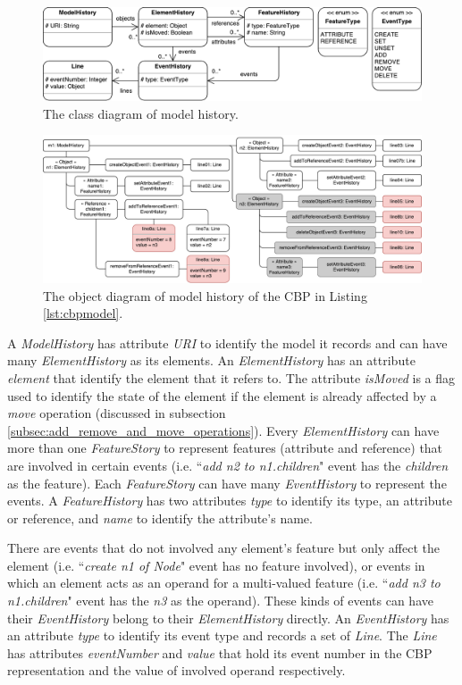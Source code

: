 \documentclass{llncs}
\begin{document}
\begin{figure}[ht]
\centering
\includegraphics[width=\linewidth]{object_history}
\caption{The class diagram of model history.}
\label{fig:object_history}
\end{figure}

\begin{figure}[ht]
\centering
\includegraphics[width=\linewidth]{history_structure}
\caption{The object diagram of model history of the CBP in Listing \ref{lst:cbpmodel}.}
\label{fig:history_structure}
\end{figure}

A \emph{ModelHistory} has attribute \emph{URI} to identify the model it records and can have many \emph{ElementHistory} as its elements. An \emph{ElementHistory} has an attribute \emph{element} that identify the element that it refers to. The attribute \emph{isMoved} is a flag used to identify the state of the element if the element is already affected by a \emph{move} operation (discussed in subsection \ref{subsec:add_remove_and_move_operations}). Every \emph{ElementHistory} can have more than one \emph{FeatureStory} to represent features (attribute and reference) that are involved in certain events (i.e. ``\emph{add n2 to n1.children}" event has the \emph{children} as the feature). Each \emph{FeatureStory} can have many \emph{EventHistory} to represent the events. A \emph{FeatureHistory} has two attributes \emph{type} to identify its type, an attribute or reference, and \emph{name} to identify the attribute's name.

There are events that do not involved any element's feature but only affect the element (i.e. ``\emph{create n1 of Node}" event has no feature involved), or events in which an element acts as an operand for a multi-valued feature (i.e. ``\emph{add n3 to n1.children}" event has the \emph{n3} as the operand). These kinds of events can have their \emph{EventHistory} belong to their \emph{ElementHistory} directly. An \emph{EventHistory} has an attribute \emph{type} to identify its event type and records a set of \emph{Line}. The \emph{Line} has attributes \emph{eventNumber} and \emph{value} that hold its event number in the CBP representation and the value of involved operand respectively. 
\end{document}
